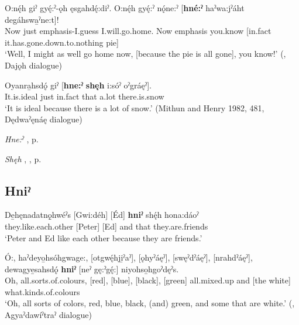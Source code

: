 \ea
\label{ex:hpar45}
\gll O:nę́h giˀ gyę́:ˀ-ǫh ęsgahdę́:diˀ. O:nę́h gyę́:ˀ nǫ́ne:ˀ [\textbf{hné:ˀ} haˀwa:jˀáht degáhswa̱ˀne:t]!\\
Now just emphasis-I.guess I.will.go.home. Now emphasis you.know [in.fact it.has.gone.down.to.nothing pie]\\
\glt ‘Well, I might as well go home now, [because the pie is all gone], you know!’ (\cite[376]{mithun_watewayestanih_1984}, Dajǫh dialogue)
\z


\ea
\label{ex:hpar46}
\gll Oyanra̱hsdǫ́ giˀ [\textbf{hne:ˀ} \textbf{shęh} i:sóˀ oˀgráęˀ].\\
It.is.ideal just in.fact that a.lot there.is.snow\\
\glt ‘It is ideal because there is a lot of snow.’ (Mithun and Henry 1982, 481, Dędwaˀęnáę dialogue)
\z


\begin{CayugaRelated}
\item \textit{Hne:ˀ} , p. \pageref{p:[hne:ˀ] ‘in fact’}\\
\item \textit{Shęh} , , p. \pageref{p:[shęh] `because’}
\end{CayugaRelated}

\subsection*{\textbf{Hniˀ} } \label{p:[hniˀ] ‘and’}

\ea
\label{ex:hpar47}
\gll De̱hęnadatnǫ̱hwéˀs [Gwi:déh] [Éd] \textbf{hniˀ} shę́h hona:dáoˀ\\
they.like.each.other [Peter] [Ed] and that they.are.friends\\
\glt ‘Peter and Ed like each other because they are friends.’
\z


\ea
\label{ex:hpar48}
\gll Ó:, haˀdeyo̱hsóhgwage:, [otgwę́hji̱ˀaˀ], [ǫhyˀáęˀ], [swęˀdˀáęˀ], [nrahdˀáęˀ], dewagye̱sahsdǫ́ \textbf{hniˀ} [neˀ gę:ˀgę́:] niyohso̱hgoˀdęˀs.\\
Oh, all.sorts.of.colours, [red], [blue], [black], [green] all.mixed.up and [the white] what.kinds.of.colours\\
\glt ‘Oh, all sorts of colors, red, blue, black, (and) green, and some that are white.’ (\cite[225]{mithun_watewayestanih_1984}, Agyaˀdawíˀtraˀ dialogue)
\z


